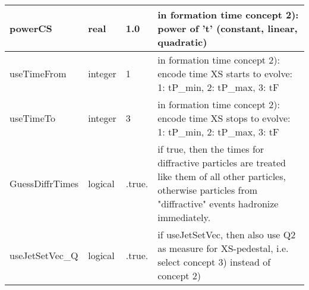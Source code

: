 \documentclass{article}
\begin{document}
\begin{longtable}{llll}
\midrule
powerCS & \begin{minipage}[t]{2cm}real\end{minipage} & \begin{minipage}[t]{2cm}1.0\end{minipage} & \begin{minipage}[t]{12cm}in formation time concept 2): power of 't' (constant, linear, quadratic)\end{minipage}\\*
\midrule
useTimeFrom & \begin{minipage}[t]{2cm}integer\end{minipage} & \begin{minipage}[t]{2cm}1\end{minipage} & \begin{minipage}[t]{12cm}in formation time concept 2): encode time XS starts to evolve: 1: tP\_min, 2: tP\_max, 3: tF\end{minipage}\\*
\midrule
useTimeTo & \begin{minipage}[t]{2cm}integer\end{minipage} & \begin{minipage}[t]{2cm}3\end{minipage} & \begin{minipage}[t]{12cm}in formation time concept 2): encode time XS stops to evolve: 1: tP\_min, 2: tP\_max, 3: tF\end{minipage}\\*
\midrule
GuessDiffrTimes & \begin{minipage}[t]{2cm}logical\end{minipage} & \begin{minipage}[t]{2cm}.true.\end{minipage} & \begin{minipage}[t]{12cm}if true, then the times for diffractive particles are treated like them of all other particles, otherwise particles from "diffractive" events hadronize immediately.\end{minipage}\\*
\midrule
useJetSetVec\_Q & \begin{minipage}[t]{2cm}logical\end{minipage} & \begin{minipage}[t]{2cm}.true.\end{minipage} & \begin{minipage}[t]{12cm}if useJetSetVec, then also use Q2 as measure for XS-pedestal, i.e. select concept 3) instead of concept 2)\end{minipage}\\*

\end{longtable}
\end{document}
